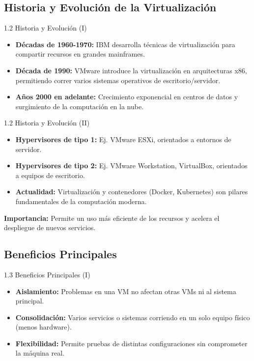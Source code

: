\documentclass{beamer}
\begin{document}
\subsection{Historia y Evolución de la Virtualización}
\begin{frame}{1.2 Historia y Evolución (I)}
	\begin{itemize}
		\item \textbf{Décadas de 1960-1970:} IBM desarrolla técnicas de virtualización para compartir recursos en grandes mainframes.
		\item \textbf{Década de 1990:} VMware introduce la virtualización en arquitecturas x86, permitiendo correr varios sistemas operativos de escritorio/servidor.
		\item \textbf{Años 2000 en adelante:} Crecimiento exponencial en centros de datos y surgimiento de la computación en la nube.
	\end{itemize}
\end{frame}

\begin{frame}{1.2 Historia y Evolución (II)}
	\begin{itemize}
		\item \textbf{Hypervisores de tipo 1:} Ej. VMware ESXi, orientados a entornos de servidor.  
		\item \textbf{Hypervisores de tipo 2:} Ej. VMware Workstation, VirtualBox, orientados a equipos de escritorio.
		\item \textbf{Actualidad:} Virtualización y contenedores (Docker, Kubernetes) son pilares fundamentales de la computación moderna.
	\end{itemize}
	\vspace{0.3cm}
	\textbf{Importancia:} Permite un uso más eficiente de los recursos y acelera el despliegue de nuevos servicios.
\end{frame}

\subsection{Beneficios Principales}
\begin{frame}{1.3 Beneficios Principales (I)}
	\begin{itemize}
		\item \textbf{Aislamiento:} Problemas en una VM no afectan otras VMs ni al sistema principal.
		\item \textbf{Consolidación:} Varios servicios o sistemas corriendo en un solo equipo físico (menos hardware).
		\item \textbf{Flexibilidad:} Permite pruebas de distintas configuraciones sin comprometer la máquina real.
	\end{itemize}
\end{frame}
\end{document}
